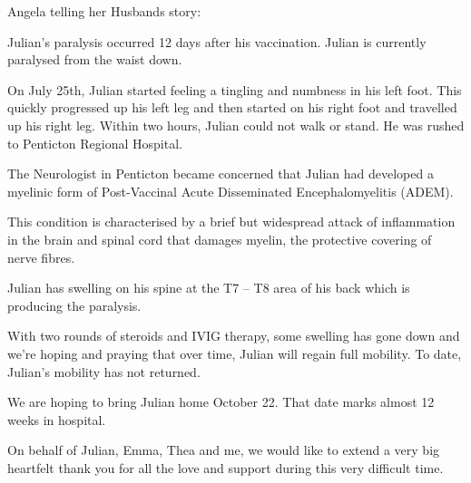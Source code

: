Angela telling her Husbands story:

Julian’s paralysis occurred 12 days after his vaccination. Julian is currently
paralysed from the waist down.

On July 25th, Julian started feeling a tingling and numbness in his left
foot. This quickly progressed up his left leg and then started on his right foot
and travelled up his right leg. Within two hours, Julian could not walk or
stand. He was rushed to Penticton Regional Hospital.

The Neurologist in Penticton became concerned that Julian had developed a
myelinic form of Post-Vaccinal Acute Disseminated Encephalomyelitis (ADEM).

This condition is characterised by a brief but widespread attack of inflammation
in the brain and spinal cord that damages myelin, the protective covering of
nerve fibres.

Julian has swelling on his spine at the T7 – T8 area of his back which is
producing the paralysis.

With two rounds of steroids and IVIG therapy, some swelling has gone down and
we’re hoping and praying that over time, Julian will regain full mobility. To
date, Julian’s mobility has not returned.

We are hoping to bring Julian home October 22. That date marks almost 12 weeks
in hospital.

On behalf of Julian, Emma, Thea and me, we would like to extend a very big
heartfelt thank you for all the love and support during this very difficult
time.

